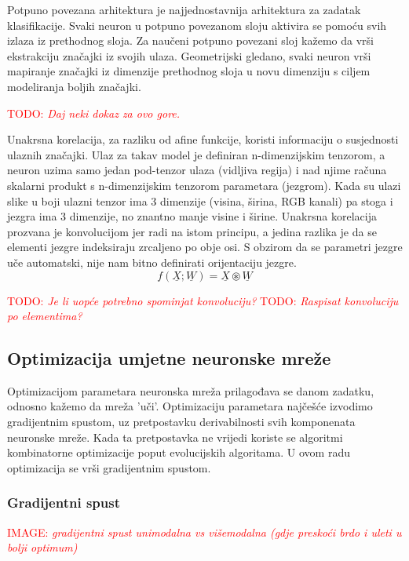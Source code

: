 \documentclass[times, utf8, diplomski]{fer}
\def\mat#1{\underline{#1}}
\def\TODO#1{\noindent\textcolor{red}{TODO: \textit{#1}}\newline}
\def\todo#1{\TODO{#1}}
\def\todoimg#1{\begin{center} \textcolor{red}{IMAGE: \textit{#1}} \end{center}}
\begin{document}
Potpuno povezana arhitektura je najjednostavnija arhitektura za zadatak klasifikacije. Svaki neuron u potpuno povezanom sloju aktivira se pomoću svih izlaza iz prethodnog sloja. Za naučeni potpuno povezani sloj kažemo da vrši ekstrakciju značajki iz svojih ulaza. Geometrijski gledano, svaki neuron vrši mapiranje značajki iz dimenzije prethodnog sloja u novu dimenziju s ciljem modeliranja boljih značajki.

\todo{Daj neki dokaz za ovo gore.}

Unakrsna korelacija, za razliku od afine funkcije, koristi informaciju o susjednosti ulaznih značajki. Ulaz za takav model je definiran n-dimenzijskim tenzorom, a neuron uzima samo jedan pod-tenzor ulaza (vidljiva regija) i nad njime računa skalarni produkt s n-dimenzijskim tenzorom parametara (jezgrom). Kada su ulazi slike u boji ulazni tenzor ima 3 dimenzije (visina, širina, RGB kanali) pa stoga i jezgra ima 3 dimenzije, no znantno manje visine i širine. Unakrsna korelacija prozvana je konvolucijom jer radi na istom principu, a jedina razlika je da se elementi jezgre indeksiraju zrcaljeno po obje osi. S obzirom da se parametri jezgre uče automatski, nije nam bitno definirati orijentaciju jezgre.
\begin{equation}
f(\mat{X};\mat{W})=\mat{X} \circledast \mat{W}
\end{equation}

\todo{Je li uopće potrebno spominjat konvoluciju?}
\todo{Raspisat konvoluciju po elementima?}

\subsection{Optimizacija umjetne neuronske mreže}
Optimizacijom parametara neuronska mreža prilagođava se danom zadatku, odnosno kažemo da mreža 'uči'. Optimizaciju parametara najčešće izvodimo gradijentnim spustom, uz pretpostavku derivabilnosti svih komponenata neuronske mreže. Kada ta pretpostavka ne vrijedi koriste se algoritmi kombinatorne optimizacije poput evolucijskih algoritama. U ovom radu optimizacija se vrši gradijentnim spustom.

\subsubsection{Gradijentni spust}

\todoimg{gradijentni spust unimodalna vs višemodalna (gdje preskoći brdo i uleti u bolji optimum)}
\label{fig:gradientni_spust}
\end{document}
